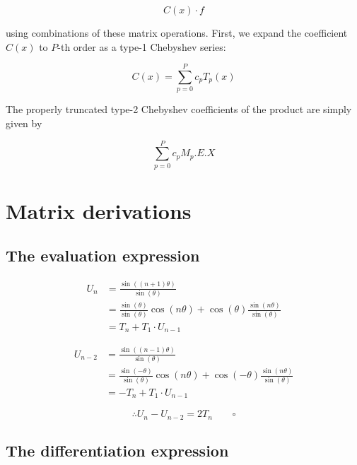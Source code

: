 \documentclass{article}
\begin{document}
\begin{equation*}
C(x) \cdot f
\end{equation*}

\noindent using combinations of these matrix operations.  First, we expand the coefficient $C(x)$ to $P$-th order as a type-1 Chebyshev series:

\begin{equation*}
C(x) = \sum_{p=0}^P c_p T_p(x)
\end{equation*}

The properly truncated type-2 Chebyshev coefficients of the product are simply given by

\begin{equation}
\sum_{p=0}^P c_p M_p.E.X
\end{equation}


\section{Matrix derivations}

\subsection{The evaluation expression}\label{deriv_eval}

\begin{align*}
U_n &= \frac{\sin((n+1) \theta)}{\sin(\theta)} \\
&= \frac{\sin(\theta)}{\sin(\theta)} \cos(n \theta) + \cos(\theta) \frac{\sin(n \theta)}{\sin(\theta)} \\
&= T_n + T_1 \cdot U_{n-1}
\end{align*}

\begin{align*}
U_{n-2} &= \frac{\sin((n-1) \theta)}{\sin(\theta)} \\
&= \frac{\sin(-\theta)}{\sin(\theta)} \cos(n \theta) + \cos(-\theta) \frac{\sin(n \theta)}{\sin(\theta)} \\
&= -T_n + T_1 \cdot U_{n-1}
\end{align*}

\begin{equation*}
\therefore U_n - U_{n-2} = 2 T_n \quad \quad \square
\end{equation*}
    
\subsection{The differentiation expression}\label{deriv_diff}
\end{document}
